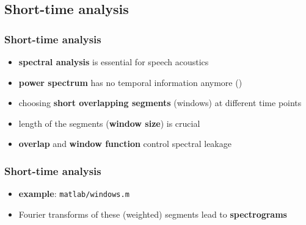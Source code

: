 
\subsection{Short-time analysis}

\begin{frame} %
	\frametitle{Short-time analysis}
	\begin{itemize}
		\item \textbf{spectral analysis} is essential for speech acoustics
		\item \textbf{power spectrum} has no temporal information anymore ()
			\begin{figure}
				\centering
				\begin{subfigure}[c]{0.48\linewidth}
				\end{subfigure}
				\hspace{0.01\linewidth}
				\begin{subfigure}[c]{0.48\linewidth}
				\end{subfigure}
			\end{figure}
		\item choosing \textbf{short overlapping segments} (windows) at different time points
		\item length of the segments (\textbf{window size}) is crucial
		\item \textbf{overlap} and \textbf{window function} control spectral leakage
	\end{itemize}
\end{frame}

\begin{frame} %
	\frametitle{Short-time analysis}
	\begin{itemize}
		\item \textbf{example}: \texttt{matlab/windows.m}
			\begin{figure}
				\centering
				\begin{subfigure}[c]{0.8\linewidth}
				\end{subfigure}
			\end{figure}
		\item Fourier transforms of these (weighted) segments lead to \textbf{spectrograms}
	\end{itemize}
\end{frame}

